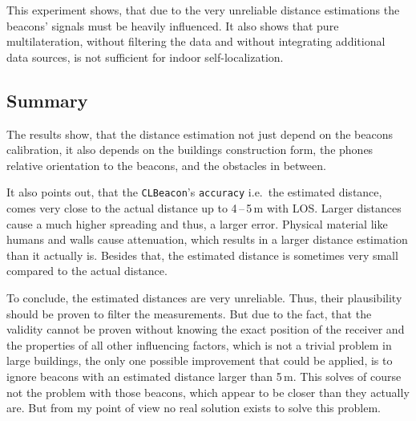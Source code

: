This experiment shows, that due to the very unreliable distance estimations the beacons' signals must be heavily influenced. It also shows that pure multilateration, without filtering the data and without integrating additional data sources, is not sufficient for indoor self-localization.

\subsection{Summary}
The results show, that the distance estimation not just depend on the beacons calibration, it also depends on the buildings construction form, the phones relative orientation to the beacons, and the obstacles in between.

It also points out, that the \texttt{CLBeacon}'s \texttt{accuracy} i.e.\ the estimated distance, comes very close to the actual distance up to 4\,--\,5\,m with \acs{LOS}. Larger distances cause a much higher spreading and thus, a larger error. Physical material like humans and walls cause attenuation, which results in a larger distance estimation than it actually is. Besides that, the estimated distance is sometimes very small compared to the actual distance.

To conclude, the estimated distances are very unreliable. Thus, their plausibility should be proven to filter the measurements. But due to the fact, that the validity cannot be proven without knowing the exact position of the receiver and the properties of all other influencing factors, which is not a trivial problem in large buildings, the only one possible improvement that could be applied, is to ignore beacons with an estimated distance larger than 5\,m. This solves of course not the problem with those beacons, which appear to be closer than they actually are. But from my point of view no real solution exists to solve this problem.